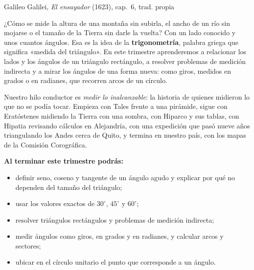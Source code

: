 \documentclass[11pt]{article}
\begin{document}
\encabezado

{Galileo Galilei, \emph{El ensayador} (1623), cap.~6, trad. propia~\cite{galileo1623}}


¿Cómo se mide la altura de una montaña sin subirla, el ancho de un río sin
mojarse o el tamaño de la Tierra sin darle la vuelta? Con un lado conocido y
unos cuantos ángulos. Esa es la idea de la \textbf{trigonometría}, palabra
griega que significa «medida del triángulo». En este trimestre aprenderemos a
relacionar los lados y los ángulos de un triángulo rectángulo, a resolver
problemas de medición indirecta y a mirar los ángulos de una forma nueva: como
giros, medidos en grados o en radianes, que recorren arcos de un círculo.

Nuestro hilo conductor es \emph{medir lo inalcanzable}: la historia de quienes
midieron lo que no se podía tocar. Empieza con Tales frente a una pirámide,
sigue con Eratóstenes midiendo la Tierra con una sombra, con Hiparco y sus
tablas, con Hipatia revisando cálculos en Alejandría, con una expedición que
pasó nueve años triangulando los Andes cerca de Quito, y termina en nuestro
país, con los mapas de la Comisión Corográfica.

\textbf{Al terminar este trimestre podrás:}
\begin{itemize}
  \item definir seno, coseno y tangente de un ángulo agudo y explicar por qué no
        dependen del tamaño del triángulo;
  \item usar los valores exactos de $30^\circ$, $45^\circ$ y $60^\circ$;
  \item resolver triángulos rectángulos y problemas de medición indirecta;
  \item medir ángulos como giros, en grados y en radianes, y calcular arcos y sectores;
  \item ubicar en el círculo unitario el punto que corresponde a un ángulo.
\end{itemize}
\end{document}
